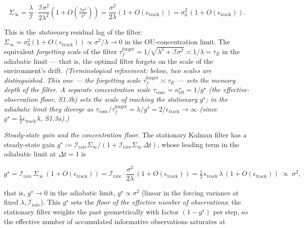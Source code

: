 \documentclass[12pt]{iopart}
\begin{document}
\begin{equation}\Sigma_\infty = \frac{\lambda}{\mathcal I}\cdot\frac{\mathcal I\sigma^2}{2\lambda^2}\left(1 + O\!\left(\tfrac{\mathcal I\sigma^2}{\lambda^2}\right)\right) = \frac{\sigma^2}{2\lambda}\left(1 + O(\epsilon_{\text{track}})\right) = \sigma_0^2\,(1 + O(\epsilon_{\text{track}})). \tag{S1.3}\end{equation}



This is the \emph{stationary} residual lag of the filter: \(\Sigma_\infty = \sigma_0^2(1+O(\epsilon_{\text{track}})) \propto \sigma^2/\lambda \to 0\) in the OU-concentration limit. The equivalent \emph{forgetting scale} of the filter \(\tau_f^{\text{forget}} = 1/\sqrt{\lambda^2 + \mathcal I\sigma^2} \asymp 1/\lambda = \tau_E\) in the adiabatic limit --- that is, the optimal filter forgets on the scale of the environment's drift. \emph{(Terminological refinement: below, two scales are distinguished. This one --- the forgetting scale \(\tau_f^{\text{forget}} \asymp \tau_E\) --- sets the memory depth of the filter. A separate concentration scale \(\tau_{\text{conc}} = n_{\text{eff}}^\star = 1/g^\star\) (the effective-observation floor, S1.3b) sets the scale of reaching the stationary \(g^\star\); in the adiabatic limit they diverge as \(\tau_{\text{conc}}/\tau_f^{\text{forget}} = \lambda/g^\star = 2/\epsilon_{\text{track}} \to \infty\) (since \(g^\star = \tfrac12\epsilon_{\text{track}}\lambda\), S1.3a).)}



\emph{Steady-state gain and the concentration floor.} The stationary Kalman filter has a steady-state gain \(g^\star := \mathcal I_{\text{rate}}\Sigma_\infty/(1 + \mathcal I_{\text{rate}}\Sigma_\infty\,\Delta t)\), whose leading term in the adiabatic limit at \(\Delta t = 1\) is



\begin{equation}g^\star = \mathcal I_{\text{rate}}\,\Sigma_\infty\,(1+O(\epsilon_{\text{track}})) = \mathcal I_{\text{rate}}\cdot\frac{\sigma^2}{2\lambda}\,(1+O(\epsilon_{\text{track}})) = \tfrac12\,\epsilon_{\text{track}}\,\lambda\,(1+O(\epsilon_{\text{track}})) \;\propto\; \sigma^2, \tag{S1.3a}\end{equation}



that is, \(g^\star \to 0\) in the adiabatic limit, \(g^\star \propto \sigma^2\) (linear in the forcing variance at fixed \(\lambda, \mathcal I_{\text{rate}}\)). This \(g^\star\) sets the \emph{floor of the effective number of observations}: the stationary filter weights the past geometrically with factor \((1-g^\star)\) per step, so the effective number of accumulated informative observations saturates at
\end{document}
